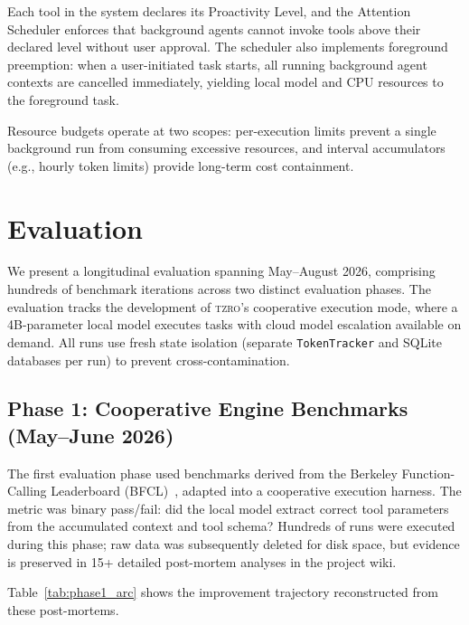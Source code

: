 \documentclass{article}
\begin{document}
Each tool in the system declares its Proactivity Level, and the Attention Scheduler enforces that background agents cannot invoke tools above their declared level without user approval.
The scheduler also implements foreground preemption: when a user-initiated task starts, all running background agent contexts are cancelled immediately, yielding local model and CPU resources to the foreground task.

Resource budgets operate at two scopes: per-execution limits prevent a single background run from consuming excessive resources, and interval accumulators (e.g., hourly token limits) provide long-term cost containment.


\section{Evaluation}
\label{sec:evaluation}

We present a longitudinal evaluation spanning May--August 2026, comprising hundreds of benchmark iterations across two distinct evaluation phases.
The evaluation tracks the development of \textsc{tzro}'s cooperative execution mode, where a 4B-parameter local model executes tasks with cloud model escalation available on demand.
All runs use fresh state isolation (separate \texttt{TokenTracker} and SQLite databases per run) to prevent cross-contamination.

\subsection{Phase 1: Cooperative Engine Benchmarks (May--June 2026)}
\label{sec:eval_phase1}

The first evaluation phase used benchmarks derived from the Berkeley Function-Calling Leaderboard (BFCL)~\cite{bfcl2024}, adapted into a cooperative execution harness.
The metric was binary pass/fail: did the local model extract correct tool parameters from the accumulated context and tool schema?
Hundreds of runs were executed during this phase; raw data was subsequently deleted for disk space, but evidence is preserved in 15+ detailed post-mortem analyses in the project wiki.

Table~\ref{tab:phase1_arc} shows the improvement trajectory reconstructed from these post-mortems.
\end{document}
